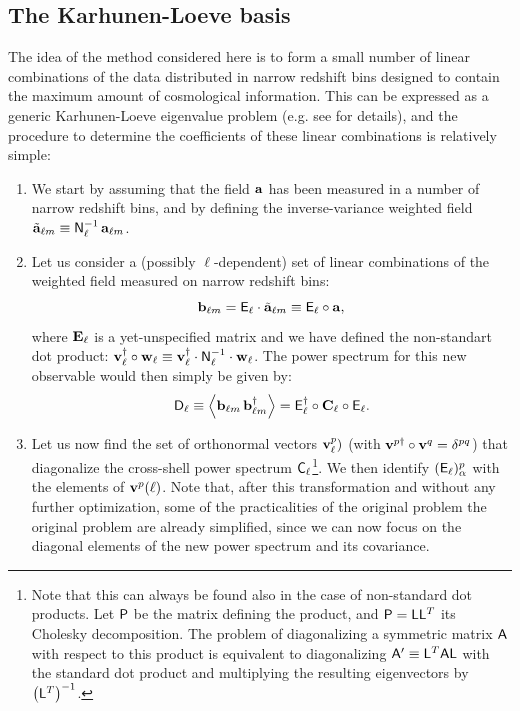 \documentclass[twocolumn,amsfont,amssymb,amsmath, showpacs,balancelastpage, nofootinbib]{revtex4-1}
\begin{document}
  \subsection{The Karhunen-Loeve basis}\label{ssec:method.klbasis}
    The idea of the method considered here is to form a small number of linear combinations of the data distributed in narrow redshift bins designed to contain the maximum amount of cosmological information. This can be expressed as a generic Karhunen-Loeve eigenvalue problem (e.g. see \cite{1997ApJ...480...22T} for details), and the procedure to determine the coefficients of these linear combinations is relatively simple:
    \begin{enumerate}
      \item We start by assuming that the field ${\bf a}$ has been measured in a number of narrow redshift bins, and by defining the inverse-variance weighted field $\tilde{\bf a}_{\ell m}\equiv{\sf N}^{-1}_\ell\,{\bf a}_{\ell m}$.
      \item Let us consider a (possibly $\ell$-dependent) set of linear combinations of the weighted field measured on narrow redshift bins:
      \begin{equation}
        {\bf b}_{\ell m}={\sf E}_\ell\cdot\tilde{\bf a}_{\ell m}\equiv{\sf E}_\ell\circ{\bf a},
      \end{equation}
      where ${\bf E}_\ell$ is a yet-unspecified matrix and we have defined the non-standart dot product: ${\bf v}^\dag_\ell\circ{\bf w}_\ell\equiv{\bf v}^\dag_\ell\cdot{\sf N}^{-1}_\ell\cdot{\bf w}_\ell$. The power spectrum for this new observable would then simply be given by:
      \begin{equation}
        {\sf D}_\ell\equiv\left\langle{\bf b}_{\ell m}\,{\bf b}^\dag_{\ell m}\right\rangle={\sf E}_\ell^\dag\circ{\bf C}_\ell\circ{\sf E}_\ell.
      \end{equation}
      \item Let us now find the set of orthonormal vectors ${\bf v}^p_\ell)$ (with ${\bf v}^{p\dag}\circ{\bf v}^q=\delta^{pq}$) that diagonalize the cross-shell power spectrum ${\sf C}_\ell$\footnote{Note that this can always be found also in the case of non-standard dot products. Let ${\sf P}$ be the matrix defining the product, and ${\sf P}={\sf L}{\sf L}^T$ its Cholesky decomposition. The problem of diagonalizing a symmetric matrix ${\sf A}$ with respect to this product is equivalent to diagonalizing ${\sf A}'\equiv{\sf L}^T{\sf A}{\sf L}$ with the standard dot product and multiplying the resulting eigenvectors by $\left({\sf L}^T\right)^{-1}$.}. We then identify $({\sf E}_\ell)^p_\alpha$ with the elements of ${\bf v}^p(\ell)$. Note that, after this transformation and without any further optimization, some of the practicalities of the original problem the original problem are already simplified, since we can now focus on the diagonal elements of the new power spectrum and its covariance.

\end{enumerate}
\end{document}
